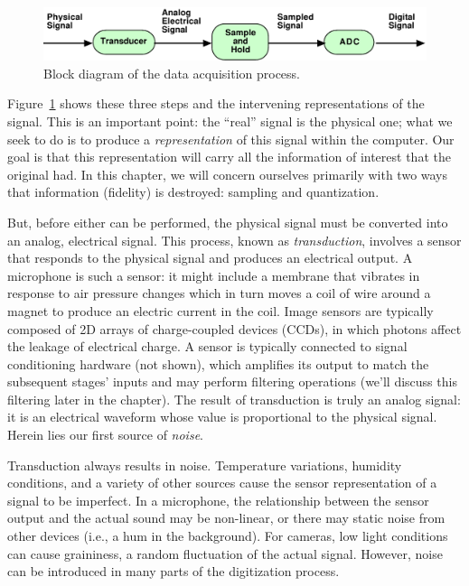 \begin{figure}
\centerline{\includegraphics[width=\textwidth]{ch-computer/adc}}
\caption{Block diagram of the data acquisition process.\label{fg:adc}}
\end{figure}

Figure~\ref{fg:adc} shows these three steps and the intervening
representations of the signal.  This is an important point: the
``real'' signal is the physical one; what we seek to do is to produce
a \emph{representation} of this signal within the computer. Our goal
is that this representation will carry all the information of interest
that the original had. In this chapter, we will concern ourselves primarily
with two ways that information (fidelity) is destroyed: sampling and
quantization.

But, before either can be performed, the physical signal must be
converted into an analog, electrical signal. This process, known as
\emph{transduction}, involves a sensor that responds to the physical
 signal and produces an electrical output. A
microphone is such a sensor: it might include a membrane that vibrates
in response to air pressure changes which in turn moves a coil of wire
around a magnet to produce an electric current in the coil. Image
sensors are typically composed of 2D arrays of charge-coupled devices
(CCDs), in which photons affect the leakage of electrical charge. A
sensor is typically connected to signal conditioning hardware (not
shown), which amplifies its output to match the subsequent stages'
inputs and may perform filtering operations (we'll discuss this
filtering later in the chapter).  The result of transduction is truly
an analog signal: it is an electrical waveform whose value is
proportional to the physical signal. Herein lies our first source of
\emph{noise}.

Transduction always results in noise. Temperature variations, humidity
conditions, and a variety of other sources cause the sensor
representation of a signal to be imperfect. In a microphone, the
relationship between the sensor output and the actual sound may be
non-linear, or there may static noise from other devices (i.e., a hum
in the background). For cameras, low light conditions can cause
graininess, a random fluctuation of the actual signal. However, noise
can be introduced in many parts of the digitization process.

